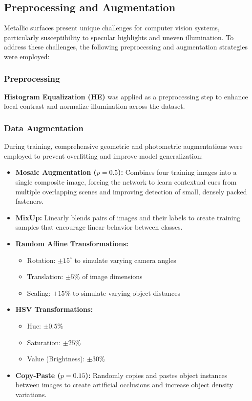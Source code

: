 \subsection{Preprocessing and Augmentation}
Metallic surfaces present unique challenges for computer vision systems, particularly susceptibility to specular highlights and uneven illumination. To address these challenges, the following preprocessing and augmentation strategies were employed:

\subsubsection{Preprocessing}
\textbf{Histogram Equalization (HE)} was applied as a preprocessing step to enhance local contrast and normalize illumination across the dataset.

\subsubsection{Data Augmentation}
During training, comprehensive geometric and photometric augmentations were employed to prevent overfitting and improve model generalization:

\begin{itemize}
    \item \textbf{Mosaic Augmentation ($p=0.5$):} Combines four training images into a single composite image, forcing the network to learn contextual cues from multiple overlapping scenes and improving detection of small, densely packed fasteners.
    
    \item \textbf{MixUp:} Linearly blends pairs of images and their labels to create training samples that encourage linear behavior between classes.
    
    \item \textbf{Random Affine Transformations:}
    \begin{itemize}
        \item Rotation: $\pm 15^\circ$ to simulate varying camera angles
        \item Translation: $\pm 5\%$ of image dimensions
        \item Scaling: $\pm 15\%$ to simulate varying object distances
    \end{itemize}
    
    \item \textbf{HSV Transformations:}
    \begin{itemize}
        \item Hue: $\pm 0.5\%$
        \item Saturation: $\pm 25\%$
        \item Value (Brightness): $\pm 30\%$
    \end{itemize}
    
    \item \textbf{Copy-Paste ($p=0.15$):} Randomly copies and pastes object instances between images to create artificial occlusions and increase object density variations.
\end{itemize}


